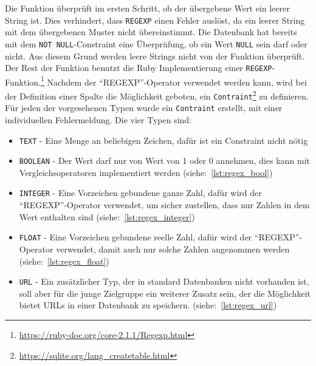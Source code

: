 Die Funktion überprüft im ersten Schritt, ob der übergebene Wert ein leerer String ist. Dies verhindert, dass \texttt{REGEXP} einen Fehler auslöst, da ein leerer String mit dem übergebenen Muster nicht übereinstimmt. Die Datenbank hat bereits mit dem \texttt{NOT NULL}-Constraint eine Überprüfung, ob ein Wert \texttt{NULL} sein darf oder nicht. Aus diesem Grund werden leere Strings nicht von der Funktion überprüft. \\
Der Rest der Funktion benutzt die Ruby Implementierung einer \texttt{REGEXP}-Funktion.\footnote{\url{https://ruby-doc.org/core-2.1.1/Regexp.html}}
Nachdem der ``REGEXP''-Operator verwendet werden kann, wird bei der Definition einer Spalte die Möglichkeit geboten, ein \texttt{Contraint}\footnote{\url{https://sqlite.org/lang_createtable.html}} zu definieren.
Für jeden der vorgesehenen Typen wurde ein \texttt{Contraint} erstellt, mit einer individuellen Fehlermeldung. Die vier Typen sind:
\begin{itemize}
    \item \texttt{TEXT} - Eine Menge an beliebigen Zeichen, dafür ist ein Constraint nicht nötig
    \item \texttt{BOOLEAN} - Der Wert darf nur von Wert von 1 oder 0 annehmen, dies kann mit Vergleichsoperatoren implementiert werden (siehe:~\ref{lst:regex_bool})
    \item \texttt{INTEGER} - Eine Vorzeichen gebundene ganze Zahl, dafür wird der ``REGEXP''-Operator verwendet, um sicher zustellen, dass nur Zahlen in dem Wert enthalten sind (siehe:~\ref{lst:regex_integer})
    \item \texttt{FLOAT} - Eine Vorzeichen gebundene reelle Zahl, dafür wird der ``REGEXP''-Operator verwendet, damit auch nur solche Zahlen angenommen werden (siehe:~\ref{lst:regex_float})
    \item \texttt{URL} - Ein zusätzlicher Typ, der in standard Datenbanken nicht vorhanden ist, soll aber für die junge Zielgruppe ein weiterer Zusatz sein, der die Möglichkeit bietet URLs in einer Datenbank zu speichern. (siehe:~\ref{lst:regex_url})
\end{itemize}





